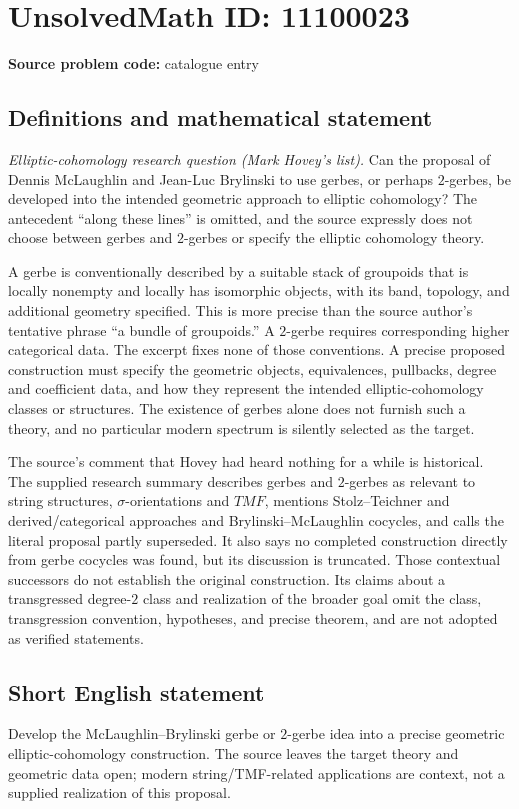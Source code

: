 \documentclass[11pt]{article}
\begin{document}
\section*{UnsolvedMath ID: 11100023}
\textbf{Source problem code:} catalogue entry
\subsection{Definitions and mathematical statement}
\emph{Elliptic-cohomology research question (Mark Hovey's list).} Can the proposal of Dennis McLaughlin and Jean-Luc Brylinski to use gerbes, or perhaps \(2\)-gerbes, be developed into the intended geometric approach to elliptic cohomology? The antecedent ``along these lines'' is omitted, and the source expressly does not choose between gerbes and \(2\)-gerbes or specify the elliptic cohomology theory.

A gerbe is conventionally described by a suitable stack of groupoids that is locally nonempty and locally has isomorphic objects, with its band, topology, and additional geometry specified. This is more precise than the source author's tentative phrase ``a bundle of groupoids.'' A \(2\)-gerbe requires corresponding higher categorical data. The excerpt fixes none of those conventions. A precise proposed construction must specify the geometric objects, equivalences, pullbacks, degree and coefficient data, and how they represent the intended elliptic-cohomology classes or structures. The existence of gerbes alone does not furnish such a theory, and no particular modern spectrum is silently selected as the target.

The source's comment that Hovey had heard nothing for a while is historical. The supplied research summary describes gerbes and \(2\)-gerbes as relevant to string structures, \(\sigma\)-orientations and \(TMF\), mentions Stolz--Teichner and derived/categorical approaches and Brylinski--McLaughlin cocycles, and calls the literal proposal partly superseded. It also says no completed construction directly from gerbe cocycles was found, but its discussion is truncated. Those contextual successors do not establish the original construction. Its claims about a transgressed degree-\(2\) class and realization of the broader goal omit the class, transgression convention, hypotheses, and precise theorem, and are not adopted as verified statements.
\subsection{Short English statement}
Develop the McLaughlin--Brylinski gerbe or \(2\)-gerbe idea into a precise geometric elliptic-cohomology construction. The source leaves the target theory and geometric data open; modern string/TMF-related applications are context, not a supplied realization of this proposal.
\end{document}
